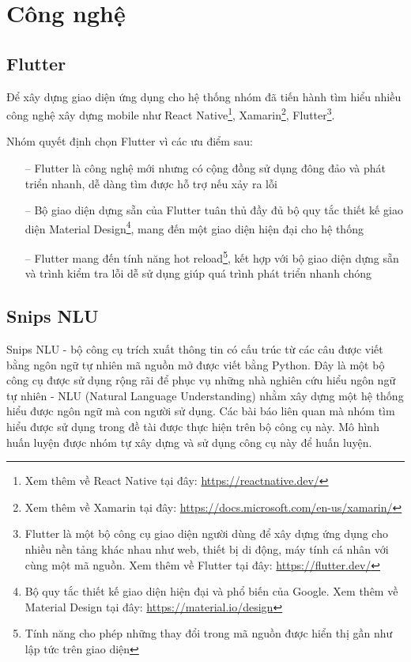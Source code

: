 \section{Công nghệ}

\subsection{Flutter}
Để xây dựng giao diện ứng dụng cho hệ thống nhóm đã tiến hành tìm hiểu nhiều công nghệ xây dựng mobile như React Native\footnote{Xem thêm về React Native tại đây: \url{https://reactnative.dev/}}, Xamarin\footnote{Xem thêm về Xamarin tại đây: \url{https://docs.microsoft.com/en-us/xamarin/}}, Flutter\footnote{Flutter là một bộ công cụ giao diện người dùng để xây dựng ứng dụng cho nhiều nền tảng khác nhau như web, thiết bị di động, máy tính cá nhân với cùng một mã nguồn. Xem thêm về Flutter tại đây: \url{https://flutter.dev/}}.

Nhóm quyết định chọn Flutter vì các ưu điểm sau:
\begin{itemize}
    \item[--] Flutter là công nghệ mới nhưng có cộng đồng sử dụng đông đảo và phát triển nhanh, dễ dàng tìm được hỗ trợ nếu xảy ra lỗi
    \item[--] Bộ giao diện dựng sẵn của Flutter tuân thủ đầy đủ bộ quy tắc thiết kế giao diện Material Design\footnote{Bộ quy tắc thiết kế giao diện hiện đại và phổ biến của Google. Xem thêm về Material Design tại đây: \url{https://material.io/design}}, mang đến một giao diện hiện đại cho hệ thống
    \item[--] Flutter mang đến tính năng hot reload\footnote{Tính năng cho phép những thay đổi trong mã nguồn được hiển thị gần như lập tức trên giao diện}, kết hợp với bộ giao diện dựng sẵn và trình kiểm tra lỗi dễ sử dụng giúp quá trình phát triển nhanh chóng
\end{itemize}

\subsection{Snips NLU}
Snips NLU - bộ công cụ trích xuất thông tin có cấu trúc từ các câu được viết bằng ngôn ngữ tự nhiên mã nguồn mở được viết bằng Python.
Đây là một bộ công cụ được sử dụng rộng rãi để phục vụ những nhà nghiên cứu hiểu ngôn ngữ tự nhiên - NLU (Natural Language Understanding) nhằm xây dựng một hệ thống hiểu được ngôn ngữ mà con người sử dụng. Các bài báo liên quan mà nhóm tìm hiểu được sử dụng trong đề tài được thực hiện trên bộ công cụ này. Mô hình huấn luyện được nhóm tự xây dựng và sử dụng công cụ này để huấn luyện.

